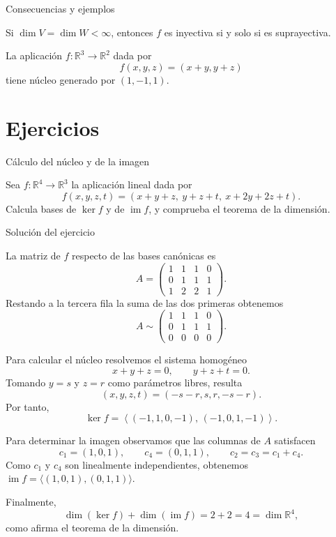 \documentclass[aspectratio=169,11pt]{beamer}
\begin{document}
\begin{frame}{Consecuencias y ejemplos}
  \begin{corollary}
    Si $\dim V=\dim W<\infty$, entonces $f$ es inyectiva si y solo si es
    suprayectiva.
  \end{corollary}

  \begin{example}
    La aplicación $f\colon\mathbb{R}^3\to\mathbb{R}^2$ dada por
    \[
      f(x,y,z)=(x+y,y+z)
    \]
    tiene núcleo generado por $(1,-1,1)$.
  \end{example}
\end{frame}

\section{Ejercicios}

\begin{frame}{Cálculo del núcleo y de la imagen}
  \begin{exercise}
    Sea $f\colon\mathbb{R}^4\to\mathbb{R}^3$ la aplicación lineal dada por
    \[
      f(x,y,z,t)=
      (x+y+z,\ y+z+t,\ x+2y+2z+t).
    \]
    Calcula bases de $\ker f$ y de $\operatorname{im}f$, y comprueba el
    teorema de la dimensión.
  \end{exercise}
\end{frame}

\begin{frame}[allowframebreaks]{Solución del ejercicio}
  \begin{solution}
    La matriz de $f$ respecto de las bases canónicas es
    \[
      A=\begin{pmatrix}
        1&1&1&0\\
        0&1&1&1\\
        1&2&2&1
      \end{pmatrix}.
    \]
    Restando a la tercera fila la suma de las dos primeras obtenemos
    \[
      A\sim
      \begin{pmatrix}
        1&1&1&0\\
        0&1&1&1\\
        0&0&0&0
      \end{pmatrix}.
    \]

    Para calcular el núcleo resolvemos el sistema homogéneo
    \[
      x+y+z=0,
      \qquad
      y+z+t=0.
    \]
    Tomando $y=s$ y $z=r$ como parámetros libres, resulta
    \[
      (x,y,z,t)=(-s-r,s,r,-s-r).
    \]
    Por tanto,
    \[
      \ker f=
      \left\langle
        (-1,1,0,-1),\,(-1,0,1,-1)
      \right\rangle.
    \]

    Para determinar la imagen observamos que las columnas de $A$ satisfacen
    \[
      c_1=(1,0,1),\qquad c_4=(0,1,1),
      \qquad c_2=c_3=c_1+c_4.
    \]
    Como $c_1$ y $c_4$ son linealmente independientes, obtenemos
    $\operatorname{im}f=\langle(1,0,1),(0,1,1)\rangle$.

    Finalmente,
    \[
      \dim(\ker f)+\dim(\operatorname{im}f)=2+2=4
      =\dim\mathbb{R}^4,
    \]
    como afirma el teorema de la dimensión.
  \end{solution}
\end{frame}
\end{document}
